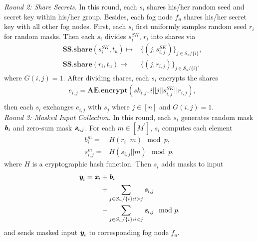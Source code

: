 \documentclass[conference,a4paper]{IEEEtran}
\def\textbi#1{\textbf{\em #1}}
\begin{document}
    {\em Round 2: Share Secrets.}
    In this round, each $s_i$ shares his/her random seed and secret key within his/her group. Besides, each fog node $f_u$ shares his/her secret key with all other fog nodes. First, each $s_i$ first uniformly samples random seed $r_i$ for random masks. Then each $s_i$ divides $s_i^{SK}$, $r_i$ into shares via
    \begin{equation}\nonumber
    \begin{aligned}
      &\textbf{SS.share}(s_i^{SK},t_u)\mapsto &\{(j,s_{i,j}^{SK})\}_{j\in \mathcal{S}_u/\{i\}},\\
      &\textbf{SS.share}(r_i,t_u)\mapsto &\{(j,r_{i,j})\}_{j\in \mathcal{S}_u/\{i\}},
    \end{aligned}
    \end{equation}
    where $G(i,j)=1$. After dividing shares, each $s_i$ encrypts the shares
    \begin{equation}\nonumber
    \begin{aligned}
        &e_{i,j}=\textbf{AE.encrypt}(sk_{i,j},i||j||s_{i,j}^{SK}||r_{i,j}),\\
    \end{aligned}
    \end{equation}
    then each $s_i$ exchanges $e_{i,j}$ with $s_j$ where $j\in [n]$ and $G(i,j)=1$.\\

    {\em Round 3: Masked Input Collection.} In this round, each $s_i$ generates random mask $\textbi{b}_i$ and zero-sum mask $\textbi{s}_{i,j}$. For each $m\in [M^\prime]$, $s_i$ computes each element
    \begin{equation}\nonumber
    \begin{aligned}
      b_i^m=&H(r_i||m) \mod{p},\\
      s_{i,j}^m=&H(s_{i,j}||m) \mod{p},
    \end{aligned}
    \end{equation}
    where $H$ is a cryptographic hash function. Then $s_i$ adds masks to input
    \begin{equation}\nonumber
    \begin{aligned}
        \textbi{y}_i=\textbi{x}_i&+\textbi{b}_i\\
                                 &+\sum_{j\in \mathcal{S}_u/\{i\}:i>j} \textbi{s}_{i,j}\\
                                 &-\sum_{j\in \mathcal{S}_u/\{i\}:i<j} \textbi{s}_{i,j}\mod{p}.
    \end{aligned}
    \end{equation}
    and sends masked input $\textbi{y}_i$ to corresponding fog node $f_u$.\\
\end{document}
